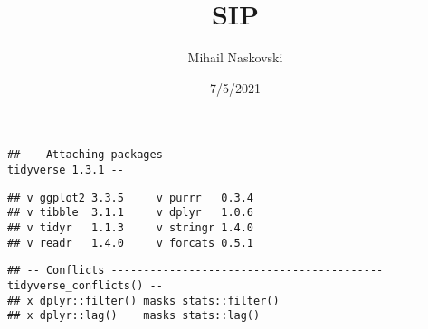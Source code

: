 \documentclass[
]{article}
\title{SIP}
\author{Mihail Naskovski}
\date{7/5/2021}
\newenvironment{Shaded}{\begin{snugshade}}{\end{snugshade}}
\newcommand{\AttributeTok}[1]{\textcolor[rgb]{0.77,0.63,0.00}{#1}}
\newcommand{\CommentTok}[1]{\textcolor[rgb]{0.56,0.35,0.01}{\textit{#1}}}
\newcommand{\ConstantTok}[1]{\textcolor[rgb]{0.00,0.00,0.00}{#1}}
\newcommand{\DecValTok}[1]{\textcolor[rgb]{0.00,0.00,0.81}{#1}}
\newcommand{\FunctionTok}[1]{\textcolor[rgb]{0.00,0.00,0.00}{#1}}
\newcommand{\NormalTok}[1]{#1}
\newcommand{\OtherTok}[1]{\textcolor[rgb]{0.56,0.35,0.01}{#1}}
\newcommand{\SpecialCharTok}[1]{\textcolor[rgb]{0.00,0.00,0.00}{#1}}
\newcommand{\StringTok}[1]{\textcolor[rgb]{0.31,0.60,0.02}{#1}}
\begin{document}
\maketitle

\begin{Shaded}
\end{Shaded}

\begin{verbatim}
## -- Attaching packages --------------------------------------- tidyverse 1.3.1 --
\end{verbatim}

\begin{verbatim}
## v ggplot2 3.3.5     v purrr   0.3.4
## v tibble  3.1.1     v dplyr   1.0.6
## v tidyr   1.1.3     v stringr 1.4.0
## v readr   1.4.0     v forcats 0.5.1
\end{verbatim}

\begin{verbatim}
## -- Conflicts ------------------------------------------ tidyverse_conflicts() --
## x dplyr::filter() masks stats::filter()
## x dplyr::lag()    masks stats::lag()
\end{verbatim}

\begin{Shaded}
\end{Shaded}
\end{document}
